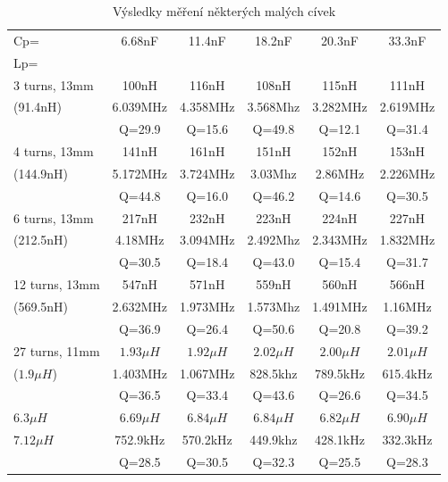 \begin{table}[H]
\begin{center}
\begin{tabular}{| l | c | c | c | c | c |}
\hline
\hspace{1.5cm} Cp= & 6.68nF    & 11.4nF    & 18.2nF    & 20.3nF    & 33.3nF \\
Lp=           &           &           &           &           &        \\ 
\hline
\hline
3 turns, 13mm & 100nH     & 116nH     & 108nH     & 115nH     & 111nH  \\
 (91.4nH) & 6.039MHz  & 4.358MHz  & 3.568Mhz  & 3.282MHz  & 2.619MHz \\
              & Q=29.9    & Q=15.6    & Q=49.8    & Q=12.1    & Q=31.4  \\
\hline
4 turns, 13mm & 141nH     & 161nH     & 151nH     & 152nH     & 153nH  \\
 (144.9nH)     & 5.172MHz  & 3.724MHz  & 3.03Mhz   & 2.86MHz   & 2.226MHz \\
              & Q=44.8    & Q=16.0    & Q=46.2    & Q=14.6    & Q=30.5  \\
\hline
6 turns, 13mm & 217nH     & 232nH     & 223nH     & 224nH     & 227nH  \\
 (212.5nH)    & 4.18MHz   & 3.094MHz  & 2.492Mhz  & 2.343MHz  & 1.832MHz \\
              & Q=30.5    & Q=18.4    & Q=43.0    & Q=15.4    & Q=31.7  \\
\hline
12 turns, 13mm     & 547nH     & 571nH     & 559nH     & 560nH     & 566nH  \\
 (569.5nH)    & 2.632MHz  & 1.973MHz  & 1.573Mhz  & 1.491MHz  & 1.16MHz \\
              & Q=36.9    & Q=26.4    & Q=50.6    & Q=20.8    & Q=39.2  \\
\hline
27 turns, 11mm & \(1.93\mu H\) & \(1.92\mu H\) & \(2.02\mu H\) & \(2.00\mu H\) & \(2.01\mu H\)  \\
(\(1.9\mu H\)) & 1.403MHz  & 1.067MHz  & 828.5khz  & 789.5kHz  & 615.4kHz \\
              & Q=36.5    & Q=33.4    & Q=43.6    & Q=26.6    & Q=34.5  \\
\hline
\(6.3\mu H\)  & \(6.69\mu H\) & \(6.84\mu H\) & \(6.84\mu H\) & \(6.82\mu H\) & \(6.90\mu H\)  \\
\(7.12\mu H\) & 752.9kHz  & 570.2kHz  & 449.9khz  & 428.1kHz  & 332.3kHz \\
              & Q=28.5    & Q=30.5    & Q=32.3    & Q=25.5    & Q=28.3  \\
\hline
\end{tabular}
\end{center}
\caption{Výsledky měření některých malých cívek}
\label{tab:littleInductors}
\end{table}

